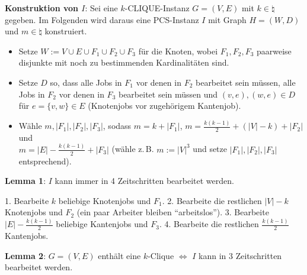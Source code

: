 \linie

\textbf{Konstruktion von $I$}:
Sei eine $k$-CLIQUE-Instanz $G = (V, E)$ mit $k \in \natural$ gegeben.
Im Folgenden wird daraus eine PCS-Instanz $I$
mit Graph $H = (W, D)$ und $m \in \natural$ konstruiert.
\begin{itemize}
    \item
    Setze $W := V \cup E \cup F_1 \cup F_2 \cup F_3$ für die Knoten,
    wobei $F_1, F_2, F_3$ paarweise disjunkte  mit noch zu bestimmenden
    Kardinalitäten sind.
    
    \item
    Setze $D$ so, dass
    alle Jobs in $F_1$ vor denen in $F_2$ bearbeitet sein müssen,
    alle Jobs in $F_2$ vor denen in $F_3$ bearbeitet sein müssen und
    $(v, e), (w, e) \in D$ für $e = \{v, w\} \in E$
    (Knotenjobs vor zugehörigem Kantenjob).
    
    \item
    Wähle $m, |F_1|, |F_2|, |F_3|$, sodass
    $m = k + |F_1|$, $m = \frac{k(k-1)}{2} + (|V| - k) + |F_2|$ und\\
    $m = |E| - \frac{k(k-1)}{2} + |F_3|$
    (wähle z.\,B. $m := |V|^3$ und setze $|F_1|, |F_2|, |F_3|$ entsprechend).
\end{itemize}

\linie

\textbf{Lemma 1}:
$I$ kann immer in 4 Zeitschritten bearbeitet werden.

\begin{Beweis}
    1. Bearbeite $k$ beliebige Knotenjobs und $F_1$.
    2. Bearbeite die restlichen $|V| - k$ Knotenjobs und $F_2$
    (ein paar Arbeiter bleiben "`arbeitslos"').
    3. Bearbeite $|E| - \frac{k(k-1)}{2}$ beliebige Kantenjobs und $F_3$.
    4. Bearbeite die restlichen $\frac{k(k-1)}{2}$ Kantenjobs.
\end{Beweis}

\textbf{Lemma 2}:
$G = (V, E)$ enthält eine $k$-Clique $\iff$ $I$ kann in 3 Zeitschritten bearbeitet werden.

